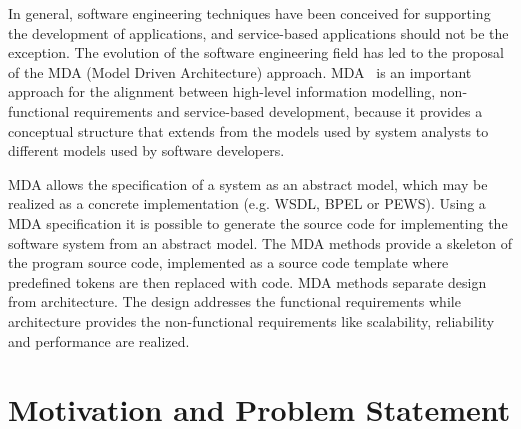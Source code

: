 In general, software engineering techniques have been conceived for supporting
the development of applications, and service-based applications should not be
the exception. The evolution of the software engineering field has led to the
proposal of the MDA (Model Driven Architecture) approach. MDA~\cite{miller} is
an important approach for the alignment between high-level information
modelling, non-functional requirements and service-based development, because it
provides a conceptual structure that extends from the models used by system
analysts to different models used by software developers.





MDA allows the specification of a system as an abstract model,
which may be realized as a concrete implementation (e.g. WSDL, BPEL or PEWS). Using a MDA
specification it is possible to generate the
source code for implementing the software system from an abstract model. The MDA
methods provide a skeleton of the program source code, implemented as a
source code template where predefined tokens are then replaced with code. MDA
methods separate design from architecture. The design addresses the functional
requirements while architecture provides the non-functional requirements like
scalability, reliability and performance are realized.    



  
\section{Motivation and Problem Statement}

